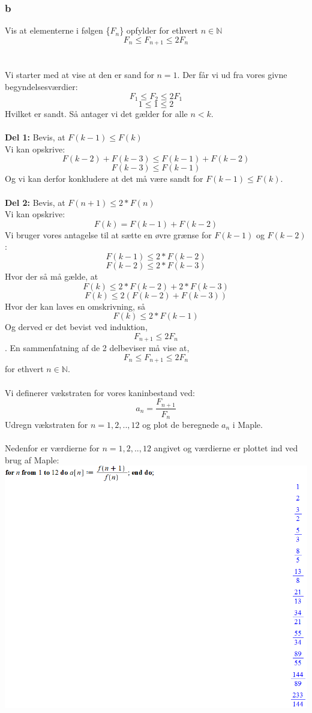 \documentclass[12pt]{article}
\begin{document}
\subsubsection*{b}
Vis at elementerne i følgen \{$F_n$\} opfylder for ethvert $n\in \mathbb{N}$
$$F_n\leq F_{n+1}\leq 2F_n$$\\
\\
Vi starter med at vise at den er sand for $n=1$. Der får vi ud fra vores givne begyndelsesværdier:\\
$$F_1\leq F_2\leq 2F_1$$
$$1\leq 1\leq 2$$
Hvilket er sandt. Så antager vi det gælder for alle $n<k$. \\
\\
\textbf{Del 1:} Bevis, at $F(k-1)\leq F(k)$\\
Vi kan opskrive:
$$F(k-2)+F(k-3)\leq F(k-1)+F(k-2)$$
$$F(k-3)\leq F(k-1)$$
Og vi kan derfor konkludere at det må være sandt for $F(k-1)\leq F(k)$.\\
\\
\textbf{Del 2:} Bevis, at $F(n+1)\leq 2*F(n)$\\
Vi kan opskrive:
$$F(k)=F(k-1)+F(k-2)$$
Vi bruger vores antagelse til at sætte en øvre grænse for $F(k-1)$ og $F(k-2)$:
$$F(k-1)\leq 2*F(k-2)$$
$$F(k-2)\leq 2*F(k-3)$$
Hvor der så må gælde, at
$$F(k)\leq 2*F(k-2)+2*F(k-3)$$
$$F(k)\leq 2(F(k-2)+F(k-3))$$
Hvor der kan laves en omskrivning, så
$$F(k)\leq 2*F(k-1)$$
Og derved er det bevist ved induktion, $$F_{n+1}\leq 2F_n$$. En sammenfatning af de 2 delbeviser må vise at,
$$F_n\leq F_{n+1}\leq 2F_n$$
for ethvert $n\in \mathbb{N}$.\\
\\
Vi definerer vækstraten for vores kaninbestand ved:
$$a_n=\frac{F_{n+1}}{F_n}$$
Udregn vækstraten for $n=1,2,..,12$ og plot de beregnede $a_n$ i Maple.\\
\\
Nedenfor er værdierne for $n=1,2,..,12$ angivet og værdierne er plottet ind ved brug af Maple:\\
\includegraphics[scale=0.6]{Pic12}\\
\end{document}
